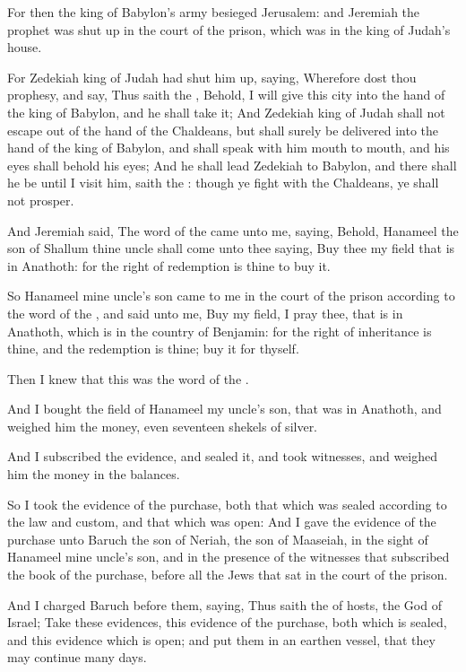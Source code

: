 \Verse For then the king of Babylon's army besieged Jerusalem: and Jeremiah the prophet was shut up in the court of the prison, which was in the king of Judah's house.

\Verse For Zedekiah king of Judah had shut him up, saying, Wherefore dost thou prophesy, and say, Thus saith the \LORD, Behold, I will give this city into the hand of the king of Babylon, and he shall take it; \Verse And Zedekiah king of Judah shall not escape out of the hand of the Chaldeans, but shall surely be delivered into the hand of the king of Babylon, and shall speak with him mouth to mouth, and his eyes shall behold his eyes; \Verse And he shall lead Zedekiah to Babylon, and there shall he be until I visit him, saith the \LORD: though ye fight with the Chaldeans, ye shall not prosper.

\Verse And Jeremiah said, The word of the \LORD came unto me, saying, \Verse Behold, Hanameel the son of Shallum thine uncle shall come unto thee saying, Buy thee my field that is in Anathoth: for the right of redemption is thine to buy it.

\Verse So Hanameel mine uncle's son came to me in the court of the prison according to the word of the \LORD, and said unto me, Buy my field, I pray thee, that is in Anathoth, which is in the country of Benjamin: for the right of inheritance is thine, and the redemption is thine; buy it for thyself.

Then I knew that this was the word of the \LORD.

\Verse And I bought the field of Hanameel my uncle's son, that was in Anathoth, and weighed him the money, even seventeen shekels of silver.

\Verse And I subscribed the evidence, and sealed it, and took witnesses, and weighed him the money in the balances.

\Verse So I took the evidence of the purchase, both that which was sealed according to the law and custom, and that which was open: \Verse And I gave the evidence of the purchase unto Baruch the son of Neriah, the son of Maaseiah, in the sight of Hanameel mine uncle's son, and in the presence of the witnesses that subscribed the book of the purchase, before all the Jews that sat in the court of the prison.

\Verse And I charged Baruch before them, saying, \Verse Thus saith the \LORD of hosts, the God of Israel; Take these evidences, this evidence of the purchase, both which is sealed, and this evidence which is open; and put them in an earthen vessel, that they may continue many days.

